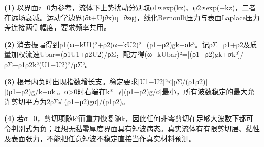 \par\noindent\textbf{(1)} 以界面z=0为参考，流体下上势扰动分别取φ1∝exp(kz)、φ2∝exp(−kz)，二者在远场衰减。运动学边界(∂t+Uj∂x)η=∂zφj，线化Bernoulli压力与表面Laplace压力差连接两侧幅度，要求频率共用。
\par\noindent\textbf{(2)} 消去振幅得到ρ1(ω−kU1)²+ρ2(ω−kU2)²=(ρ1−ρ2)gk+σk³。记ρΣ=ρ1+ρ2及质量加权流速Ubar=(ρ1U1+ρ2U2)/ρΣ，配方得(ω−kUbar)²=[(ρ1−ρ2)gk+σk³]/ρΣ−ρ1ρ2k²(U1−U2)²/ρΣ²。
\par\noindent\textbf{(3)} 根号内负时出现指数增长支。稳定要求|U1−U2|²≤[ρΣ/(ρ1ρ2)][(ρ1−ρ2)g/k+σk]。σ>0时右端在k*=√[(ρ1−ρ2)g/σ]最小，所有波数稳定的最大允许剪切平方为2ρΣ√[(ρ1−ρ2)gσ]/(ρ1ρ2)。
\par\noindent\textbf{(4)} 若σ=0，剪切项随k²而重力恢复随k，因此任何非零剪切在足够大波数下都可令判别式为负；理想无黏零厚度界面具有短波病态。真实流体有有限剪切层、黏性及表面张力，不能把任意短波不稳定直接当作真实材料预测。
